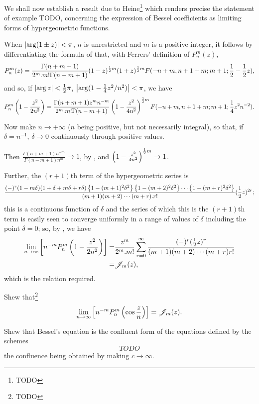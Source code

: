 We shall now establish a result due to Heine\footnote{TODO} which
renders precise the statement of  example
TODO, concerning the expression of Bessel coefficients as limiting
forms of hypergeometric functions.

When $\left| \arg(1\pm z) \right| < \pi$, $n$ is unrestricted and $m$ is a
positive integer, it follows by differentiating the formula of
 that, with Ferrers' definition of
$P_{n}^{m}(z)$,
$$
P_{n}^{m}(z)
=
\frac{\Gamma(n+m+1)}{2^{m} . m! \Gamma(n-m+1)}
(1-z)^{\frac{1}{2} m}
(1+z)^{\frac{1}{2} m}
F(-n+m,n+1+m; m+1; \frac{1}{2} - \frac{1}{2} z),
$$
and so, if $\left| \arg z \right| < \frac{1}{2}\pi$,
$\left| \arg (1 - \frac{1}{4} z^{2}/n^{2}) \right| < \pi$, we have
$$
P_{n}^{m}\left( 1 - \frac{z^{2}}{2n^{2}} \right)
=
\frac{\Gamma(n+m+1) z^{m} n^{-m}}{2^{m} . m! \Gamma(n-m+1)}
\left( 1 - \frac{z^{2}}{4n^{2}} \right)^{\frac{1}{2} m}
F(-n+m,n+1+m;m+1; \frac{1}{4} z^{2} n^{-2}).
$$

Now make $n \rightarrow +\infty$ ($n$ being positive, but not
necessarily integral), so that, if $\delta = n^{-1}$, 
$\delta \rightarrow 0$ continuously through positive values.

Then
$ \frac{\Gamma(n+m+1)n^{-m}}{\Gamma(n-m+1) n^{m}} \rightarrow 1$,
by , and
$ \left( 1 - \frac{z^{2}}{4n^{2}} \right)^{\frac{1}{2} m} \rightarrow 1$.

Further, the $(r+1)$th term of the hypergeometric series is
$$
\frac{
  (-)^{r}
  (1-m\delta)
  (1+\delta+m\delta+r\delta)
  \left\{  1 - (m+1)^{2} \delta^{2}  \right\}
  \left\{  1 - (m+2)^{2} \delta^{2}  \right\}
  \cdots
  \left\{  1 - (m+r)^{2} \delta^{2}  \right\}
}{ (m+1)(m+2)\cdots(m+r).r!}
(\frac{1}{2} z)^{2r};
$$
this is a continuous function of $\delta$ and the series of which this
is the $(r+1)$th term is easily seen to converge uniformly in a range
of values of $\delta$ including the point $\delta=0$; so, by
, we have
\begin{align*}
  \lim_{n \rightarrow \infty}
  \left[  n^{-m} P_{n}^{m}\left( 1 - \frac{z^{2}}{2n^{2}} \right) \right]
  =& \frac{z^{m}}{2^{m}.m!}
  \sum_{r=0}^{\infty} \frac{(-)^{r} (\frac{1}{2}
    z)^{r}}{(m+1)(m+2)\cdots(m+r)r!} \\
  =& \mathscr{J}_{m}(z),
\end{align*}
which is the relation required.
\begin{wandwexample}
  Shew that\footnote{TODO}
  $$
  \lim_{n\rightarrow\infty}
  \left[  n^{-m} P_{n}^{m}\left( \cos \frac{z}{n} \right) \right] = \mathscr{J}_{m}(z).
  $$
\end{wandwexample}
% 
% 
\begin{wandwexample}
  Shew that Bessel's equation is the confluent form of the equations
  defined by the schemes
  $$
  TODO
  $$
  the confluence being obtained by making $c \rightarrow \infty$.
\end{wandwexample}

